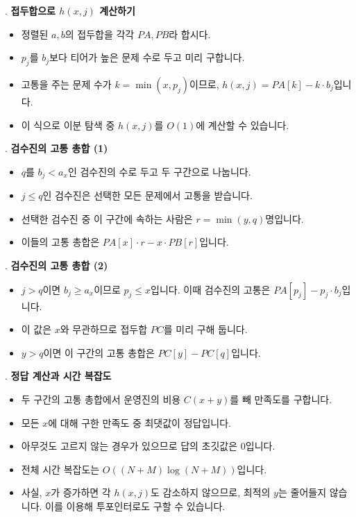 \begin{frame}{\textbf{\pletter}. \ptitle}
    \textbf{접두합으로 $h(x,j)$ 계산하기}
    \begin{itemize}
        \item 정렬된 $a,b$의 접두합을 각각 $PA,PB$라 합시다.
        \item $p_j$를 $b_j$보다 티어가 높은 문제 수로 두고 미리 구합니다.
        \item 고통을 주는 문제 수가 $k=\min(x,p_j)$이므로, $h(x,j)=PA[k]-k\cdot b_j$입니다.
        \item 이 식으로 이분 탐색 중 $h(x,j)$를 $O(1)$에 계산할 수 있습니다.
    \end{itemize}
\end{frame}

\begin{frame}{\textbf{\pletter}. \ptitle}
    \textbf{검수진의 고통 총합 (1)}
    \begin{itemize}
        \item $q$를 $b_j<a_x$인 검수진의 수로 두고 두 구간으로 나눕니다.
        \item $j\le q$인 검수진은 선택한 모든 문제에서 고통을 받습니다.
        \item 선택한 검수진 중 이 구간에 속하는 사람은 $r=\min(y,q)$명입니다.
        \item 이들의 고통 총합은 $PA[x]\cdot r-x\cdot PB[r]$입니다.
    \end{itemize}
\end{frame}

\begin{frame}{\textbf{\pletter}. \ptitle}
    \textbf{검수진의 고통 총합 (2)}
    \begin{itemize}
        \item $j>q$이면 $b_j\ge a_x$이므로 $p_j\le x$입니다. 이때 검수진의 고통은 $PA[p_j]-p_j\cdot b_j$입니다.
        \item 이 값은 $x$와 무관하므로 접두합 $PC$를 미리 구해 둡니다.
        \item $y>q$이면 이 구간의 고통 총합은 $PC[y]-PC[q]$입니다.
    \end{itemize}
\end{frame}

\begin{frame}{\textbf{\pletter}. \ptitle}
    \textbf{정답 계산과 시간 복잡도}
    \begin{itemize}
        \item 두 구간의 고통 총합에서 운영진의 비용 $C(x+y)$를 빼 만족도를 구합니다.
        \item 모든 $x$에 대해 구한 만족도 중 최댓값이 정답입니다.
        \item 아무것도 고르지 않는 경우가 있으므로 답의 초깃값은 $0$입니다.
        \item 전체 시간 복잡도는 $O((N+M)\log(N+M))$입니다.
        \item 사실, $x$가 증가하면 각 $h(x,j)$도 감소하지 않으므로, 최적의 $y$는 줄어들지 않습니다. 이를 이용해 투포인터로도 구할 수 있습니다.
    \end{itemize}
\end{frame}
